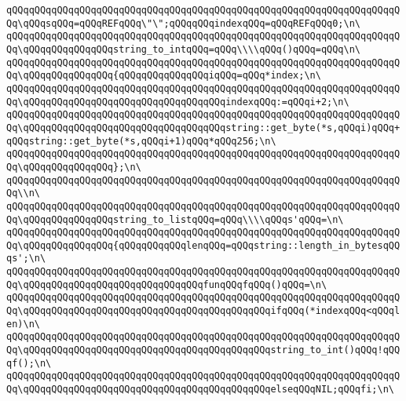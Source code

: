 \verb|qQQqqQQqqQQqqQQqqQQqqQQqqQQqqQQqqQQqqQQqqQQqqQQqqQQqqQQqqQQqqQQqqQQqqQQq\qQQqsqQQq=qQQqREFqQQq\"\";qQQqqQQqindexqQQq=qQQqREFqQQq0;\n\|\newline
\verb|qQQqqQQqqQQqqQQqqQQqqQQqqQQqqQQqqQQqqQQqqQQqqQQqqQQqqQQqqQQqqQQqqQQqqQQq\qQQqqQQqqQQqqQQqstring_to_intqQQq=qQQq\\\\qQQq()qQQq=qQQq\n\|\newline
\verb|qQQqqQQqqQQqqQQqqQQqqQQqqQQqqQQqqQQqqQQqqQQqqQQqqQQqqQQqqQQqqQQqqQQqqQQq\qQQqqQQqqQQqqQQq{qQQqqQQqqQQqqQQqiqQQq=qQQq*index;\n\|\newline
\verb|qQQqqQQqqQQqqQQqqQQqqQQqqQQqqQQqqQQqqQQqqQQqqQQqqQQqqQQqqQQqqQQqqQQqqQQq\qQQqqQQqqQQqqQQqqQQqqQQqqQQqqQQqqQQqindexqQQq:=qQQqi+2;\n\|\newline
\verb|qQQqqQQqqQQqqQQqqQQqqQQqqQQqqQQqqQQqqQQqqQQqqQQqqQQqqQQqqQQqqQQqqQQqqQQq\qQQqqQQqqQQqqQQqqQQqqQQqqQQqqQQqqQQqstring::get_byte(*s,qQQqi)qQQq+qQQqstring::get_byte(*s,qQQqi+1)qQQq*qQQq256;\n\|\newline
\verb|qQQqqQQqqQQqqQQqqQQqqQQqqQQqqQQqqQQqqQQqqQQqqQQqqQQqqQQqqQQqqQQqqQQqqQQq\qQQqqQQqqQQqqQQq};\n\|\newline
\verb|qQQqqQQqqQQqqQQqqQQqqQQqqQQqqQQqqQQqqQQqqQQqqQQqqQQqqQQqqQQqqQQqqQQqqQQq\\n\|\newline
\verb|qQQqqQQqqQQqqQQqqQQqqQQqqQQqqQQqqQQqqQQqqQQqqQQqqQQqqQQqqQQqqQQqqQQqqQQq\qQQqqQQqqQQqqQQqstring_to_listqQQq=qQQq\\\\qQQqs'qQQq=\n\|\newline
\verb|qQQqqQQqqQQqqQQqqQQqqQQqqQQqqQQqqQQqqQQqqQQqqQQqqQQqqQQqqQQqqQQqqQQqqQQq\qQQqqQQqqQQqqQQq{qQQqqQQqqQQqlenqQQq=qQQqstring::length_in_bytesqQQqs';\n\|\newline
\verb|qQQqqQQqqQQqqQQqqQQqqQQqqQQqqQQqqQQqqQQqqQQqqQQqqQQqqQQqqQQqqQQqqQQqqQQq\qQQqqQQqqQQqqQQqqQQqqQQqqQQqqQQqfunqQQqfqQQq()qQQq=\n\|\newline
\verb|qQQqqQQqqQQqqQQqqQQqqQQqqQQqqQQqqQQqqQQqqQQqqQQqqQQqqQQqqQQqqQQqqQQqqQQq\qQQqqQQqqQQqqQQqqQQqqQQqqQQqqQQqqQQqqQQqqQQqifqQQq(*indexqQQq<qQQqlen)\n\|\newline
\verb|qQQqqQQqqQQqqQQqqQQqqQQqqQQqqQQqqQQqqQQqqQQqqQQqqQQqqQQqqQQqqQQqqQQqqQQq\qQQqqQQqqQQqqQQqqQQqqQQqqQQqqQQqqQQqqQQqqQQqstring_to_int()qQQq!qQQqf();\n\|\newline
\verb|qQQqqQQqqQQqqQQqqQQqqQQqqQQqqQQqqQQqqQQqqQQqqQQqqQQqqQQqqQQqqQQqqQQqqQQq\qQQqqQQqqQQqqQQqqQQqqQQqqQQqqQQqqQQqqQQqqQQqelseqQQqNIL;qQQqfi;\n\|\newline
